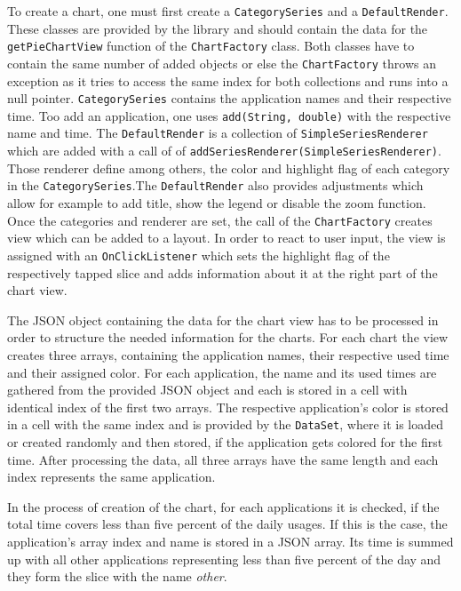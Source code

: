 To  create a chart, one must first create a \lstinline$CategorySeries$ and a \lstinline$DefaultRender$. These classes are provided by the library and should contain the data for the \lstinline$getPieChartView$ function of the \lstinline$ChartFactory$ class. Both classes have to contain the same number of added objects or else the \lstinline$ChartFactory$ throws an exception as it tries to access the same index for both collections and runs into a null pointer. \lstinline$CategorySeries$ contains the application names and their respective time. Too add an application, one uses \lstinline$add(String, double)$ with the respective name and time. The \lstinline$DefaultRender$ is a collection of \lstinline$SimpleSeriesRenderer$ which are added with a call of of \lstinline$addSeriesRenderer(SimpleSeriesRenderer)$. Those renderer define among others, the color and highlight flag of each category in the \lstinline$CategorySeries$.The \lstinline$DefaultRender$ also provides adjustments which allow for example to add title, show the legend or disable the zoom function. Once the categories and renderer are set, the call of the \lstinline$ChartFactory$ creates view which can be added to a layout. In order to react to user input, the view is assigned with an \lstinline$OnClickListener$ which sets the highlight flag of the respectively tapped slice and adds information about it at the right part of the chart view.

The  JSON object containing the data for the chart view has to be processed in order to structure the needed information for the charts. For each chart the view creates three arrays, containing the application names, their respective used time and their assigned color. For each application, the name and its used times are gathered from the provided JSON object and each is stored in a cell with identical index of the first two arrays. The respective application's color is stored in a cell with the same index and is provided by the \lstinline$DataSet$, where it is loaded or created randomly and then stored, if the application gets colored for the first time. After processing the data, all three arrays have the same length and each index represents the same application.

In the process of creation of the chart, for each applications it is checked, if the total time covers less than five percent of the daily usages. If this is the case, the application's array index and name is stored in a JSON array. Its time is summed up with all other applications representing less than five percent of the day and they form the slice with the name \emph{other}.

